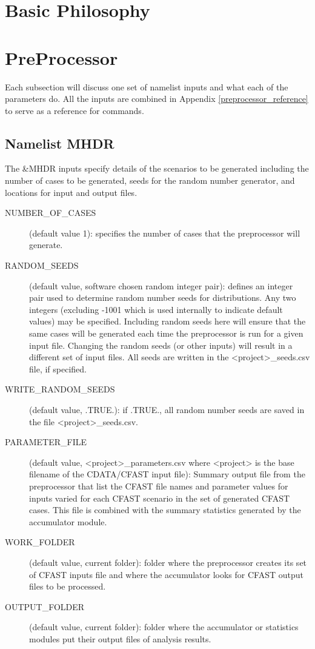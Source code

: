 \documentclass[12pt,twoside]{book}
\begin{document}
\section{Basic Philosophy}

\section{PreProcessor}

\label{commands_section}
Each subsection will discuss one set of namelist inputs and what each of the parameters do. All the inputs are combined in Appendix \ref{preprocessor_reference}  to serve as a reference for commands.

\subsection{Namelist MHDR}

The {\ct \&MHDR} inputs specify details of the scenarios to be generated including the number of cases to be generated, seeds for the random number generator, and locations for input and output files.

\begin{description}
  \item[NUMBER\_OF\_CASES] (default value 1): specifies the number of cases that the preprocessor will generate.
  \item[RANDOM\_SEEDS] (default value, software chosen random integer pair): defines an integer pair used to determine random number seeds for distributions. Any two integers (excluding -1001 which is used internally to indicate default values) may be specified. Including random seeds here will ensure that the same cases will be generated each time the preprocessor is run for a given input file. Changing the random seeds (or other inputs) will result in a different set of input files.  All seeds are written in the {\ct <project>\_seeds.csv} file, if specified.
  \item[WRITE\_RANDOM\_SEEDS] (default value, .TRUE.): if .TRUE., all random number seeds are saved in the file {\ct <project>\_seeds.csv}.
  \item[PARAMETER\_FILE] (default value, {\ct <project>\_parameters.csv} where {\ct <project>} is the base filename of the CDATA/CFAST input file): Summary output file from the preprocessor that list the CFAST file names and parameter values for inputs varied for each CFAST scenario in the set of generated CFAST cases. This file is combined with the summary statistics generated by the accumulator module.
  \item[WORK\_FOLDER] (default value, current folder): folder where the preprocessor creates its set of CFAST inputs file and where the accumulator looks for CFAST output files to be processed.
  \item[OUTPUT\_FOLDER] (default value, current folder): folder where the accumulator or statistics modules put their output files of analysis results.
\end{description}
\end{document}
